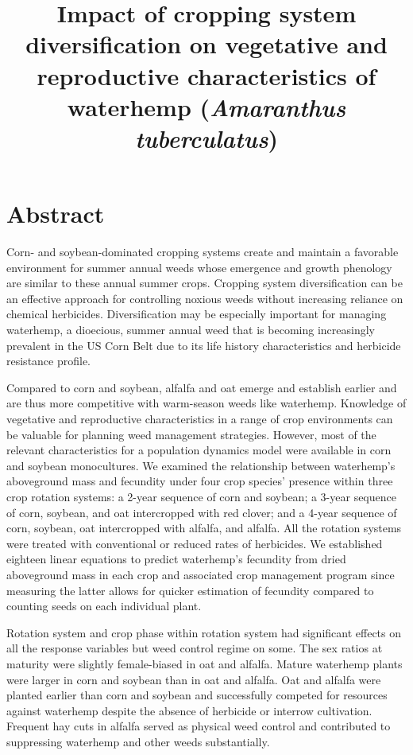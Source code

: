 \documentclass[
]{article}
\title{Impact of cropping system diversification on vegetative and reproductive characteristics of waterhemp (\emph{Amaranthus tuberculatus})}
\author{}
\date{\vspace{-2.5em}}
\begin{document}
\maketitle
\hypertarget{abstract}{%
\section*{Abstract}\label{abstract}}

Corn- and soybean-dominated cropping systems create and maintain a favorable environment for summer annual weeds whose emergence and growth phenology are similar to these annual summer crops. Cropping system diversification can be an effective approach for controlling noxious weeds without increasing reliance on chemical herbicides. Diversification may be especially important for managing waterhemp, a dioecious, summer annual weed that is becoming increasingly prevalent in the US Corn Belt due to its life history characteristics and herbicide resistance profile.

Compared to corn and soybean, alfalfa and oat emerge and establish earlier and are thus more competitive with warm-season weeds like waterhemp. Knowledge of vegetative and reproductive characteristics in a range of crop environments can be valuable for planning weed management strategies. However, most of the relevant characteristics for a population dynamics model were available in corn and soybean monocultures. We examined the relationship between waterhemp's aboveground mass and fecundity under four crop species' presence within three crop rotation systems: a 2-year sequence of corn and soybean; a 3-year sequence of corn, soybean, and oat intercropped with red clover; and a 4-year sequence of corn, soybean, oat intercropped with alfalfa, and alfalfa. All the rotation systems were treated with conventional or reduced rates of herbicides. We established eighteen linear equations to predict waterhemp's fecundity from dried aboveground mass in each crop and associated crop management program since measuring the latter allows for quicker estimation of fecundity compared to counting seeds on each individual plant.

Rotation system and crop phase within rotation system had significant effects on all the response variables but weed control regime on some. The sex ratios at maturity were slightly female-biased in oat and alfalfa. Mature waterhemp plants were larger in corn and soybean than in oat and alfalfa. Oat and alfalfa were planted earlier than corn and soybean and successfully competed for resources against waterhemp despite the absence of herbicide or interrow cultivation. Frequent hay cuts in alfalfa served as physical weed control and contributed to suppressing waterhemp and other weeds substantially.
\end{document}
